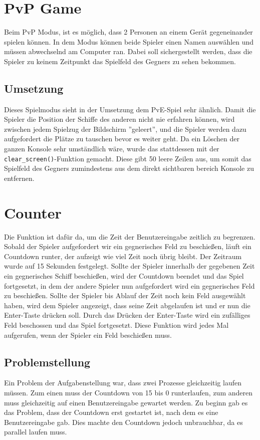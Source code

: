 \documentclass{article}
\begin{document}
\section{PvP Game}
\par
    Beim PvP Modus, ist es möglich, dass 2 Personen an einem Gerät gegeneinander spielen können. In dem Modus können beide Spieler einen Namen auswählen und müssen abwechselnd am Computer ran. Dabei soll sichergestellt werden, dass die Spieler zu keinem Zeitpunkt das Spielfeld des Gegners zu sehen bekommen.
\subsection{Umsetzung}
    Dieses Spielmodus sieht in der Umsetzung dem PvE-Spiel sehr ähnlich. Damit die Spieler  die Position der Schiffe des anderen nicht nie erfahren können, wird zwischen jedem Spielzug der Bildschirm ''geleert'', und die Spieler werden dazu aufgefordert die Plätze zu tauschen bevor es weiter geht. Da ein Löschen der ganzen Konsole sehr umständlich wäre, wurde das stattdessen mit der \verb$clear_screen()$-Funktion gemacht. Diese gibt 50 leere Zeilen aus, um somit das Spielfeld des Gegners zumindestens aus dem direkt sichtbaren bereich Konsole zu entfernen.


\section{Counter}
    Die Funktion ist dafür da, um die Zeit der Benutzereingabe zeitlich zu begrenzen. Sobald der Spieler aufgefordert wir ein gegnerisches Feld zu beschießen,  läuft ein Countdown runter, der aufzeigt wie viel Zeit noch übrig bleibt. Der Zeitraum wurde auf 15 Sekunden festgelegt. Sollte der Spieler innerhalb der gegebenen Zeit ein gegnerisches Schiff beschießen, wird der Countdown beendet und das Spiel fortgesetzt, in dem der andere Spieler nun aufgefordert wird ein gegnerisches Feld zu beschießen. Sollte der Spieler bis Ablauf der Zeit noch kein Feld ausgewählt haben, wird dem Spieler angezeigt, dass seine Zeit abgelaufen ist und er nun die Enter-Taste drücken soll. Durch das Drücken der Enter-Taste wird ein zufälliges Feld beschossen und das Spiel fortgesetzt.
    Diese Funktion wird jedes Mal aufgerufen, wenn der Spieler ein Feld beschießen muss.

\subsection{Problemstellung}
    Ein Problem der Aufgabenstellung war, dass zwei Prozesse gleichzeitig laufen müssen. Zum einen muss der Countdown von 15 bis 0 runterlaufen, zum anderen muss gleichzeitig auf einen Benutzereingabe gewartet werden. Zu beginn gab es das Problem, dass der Countdown erst gestartet ist, nach dem es eine Benutzereingabe gab. Dies machte den Countdown jedoch unbrauchbar, da es parallel laufen muss.
\end{document}
